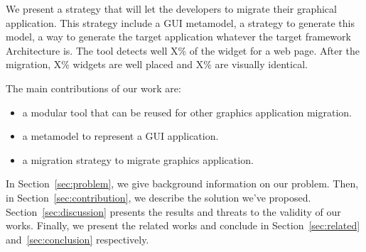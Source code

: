 \documentclass[conference]{IEEEtran}
\begin{document}
    
    
    We present a strategy that will let the developers to migrate their graphical application.
    This strategy include a GUI metamodel,
        a strategy to generate this model,
        a way to generate the target application whatever the target framework Architecture is.
    The tool detects well X\% of the widget for a web page.
    After the migration, X\% widgets are well placed and X\% are visually identical.
    
    
    The main contributions of our work are:
    \begin{itemize}
    
        \item a modular tool that can be reused for other graphics application migration.
    
        \item a metamodel to represent a GUI application.
    
        \item a migration strategy to migrate graphics application.
        
    \end{itemize}
    
    
    In Section~\ref{sec:problem}, we give background information on our problem. 
    Then, in Section~\ref{sec:contribution}, we describe the solution we've proposed.
    Section~\ref{sec:discussion} presents the results and threats to the validity of our works.
    Finally, we present the related works and conclude in Section~\ref{sec:related} and~\ref{sec:conclusion} respectively.
    
\end{document}

